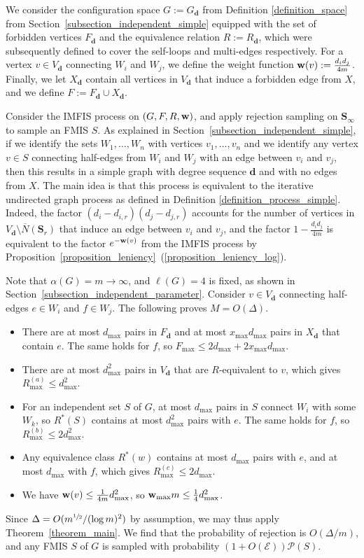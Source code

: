 \documentclass{article}
\theoremstyle{plain}
\theoremstyle{remark}
\theoremstyle{plain}
\numberwithin{equation}{section}
\renewcommand{\d}{{\boldsymbol{d}}}
\renewcommand{\b}{{\bf{w}}}
\begin{document}
	We consider the configuration space $G:=G_\d$ from Definition \ref{definition_space} from Section~\ref{subsection_independent_simple} equipped with the set of forbidden vertices $F_\d$ and the equivalence relation $R:=R_\d$, which were subsequently defined to cover the self-loops and multi-edges respectively. For a vertex $v\in V_\d$ connecting $W_i$ and $W_j$, we define the weight function $\b(v):=\tfrac{d_id_j}{4m}$. Finally, we let $X_\d$ contain all vertices in $V_\d$ that induce a forbidden edge from $X$, and we define $F:=F_\d\cup X_\d$.
	
	Consider the IMFIS process on $(G,F,R,\b)$, and apply rejection sampling on $\boldsymbol{S}_{\infty}$ to sample an FMIS $S$. As explained in Section~\ref{subsection_independent_simple}, if we identify the sets $W_1,\ldots,W_n$ with vertices $v_1,\ldots,v_n$ and we identify any vertex $v\in S$ connecting half-edges from $W_i$ and $W_j$ with an edge between $v_i$ and $v_j$, then this results in a simple graph with degree sequence $\d$ and with no edges from $X$. The main idea is that this process is equivalent to the iterative undirected graph process as defined in Definition \ref{definition_process_simple}. Indeed, the factor $(d_i-d_{i,r})(d_j-d_{j,r})$ accounts for the number of vertices in $V_{\d}\setminus\overline{N}(\boldsymbol{S}_r)$ that induce an edge between $v_i$ and $v_j$, and the factor $1-\frac{d_id_j}{4m}$ is equivalent to the factor $e^{-\b(v)}$ from the IMFIS process by Proposition~\ref{proposition_leniency}~(\ref{proposition_leniency_log}).
	
	Note that $\alpha(G)=m\to\infty$, and $\ell(G)=4$ is fixed, as shown in Section~\ref{subsection_independent_parameter}. Consider $v\in V_\d$ connecting half-edges $e\in W_i$ and $f\in W_j$. The following proves $M=O(\Delta)$.
	\begin{itemize}
		\item There are at most $d_{\max}$ pairs in $F_\d$ and at most $x_{\max}d_{\max}$ pairs in $X_\d$ that contain $e$. The same holds for $f$, so $F_{\max}\leq2d_{\max}+2x_{\max}d_{\max}$.
		\item There are at most $d_{\max}^2$ pairs in $V_\d$ that are $R$-equivalent to $v$, which gives $R_{\max}^{(a)}\leq d_{\max}^2$.
		\item For an independent set $S$ of $G$, at most $d_{\max}$ pairs in $S$ connect $W_i$ with some $W_k$, so $R^*(S)$ contains at most $d_{\max}^2$ pairs with $e$. The same holds for $f$, so $R_{\max}^{(b)}\leq2d_{\max}^2$.
		\item Any equivalence class $R^*(w)$ contains at most $d_{\max}$ pairs with $e$, and at most $d_{\max}$ with $f$, which gives $R_{\max}^{(c)}\leq2d_{\max}$.
		\item We have $\b(v)\leq\frac1{4m}d_{\max}^2$, so $\b_{\max}m\leq\frac14d_{\max}^2$.
	\end{itemize}
	Since $\Delta=O(m^{\sfrac12}/(\log m)^2)$ by assumption, we may thus apply Theorem~\ref{theorem_main}. We find that the probability of rejection is $O(\Delta/m)$, and any FMIS $S$ of $G$ is sampled with probability $(1+O(\mathscr{E}))\mathscr{P}(S)$.
	
\end{document}
